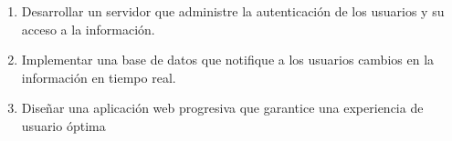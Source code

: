 \begin{enumerate}
\item Desarrollar un servidor que administre la autenticación de los usuarios y su acceso a la información.
\item Implementar una base de datos que notifique a los usuarios cambios en la información en tiempo real.
\item Diseñar una aplicación web progresiva que garantice una experiencia de usuario óptima
\end{enumerate}
